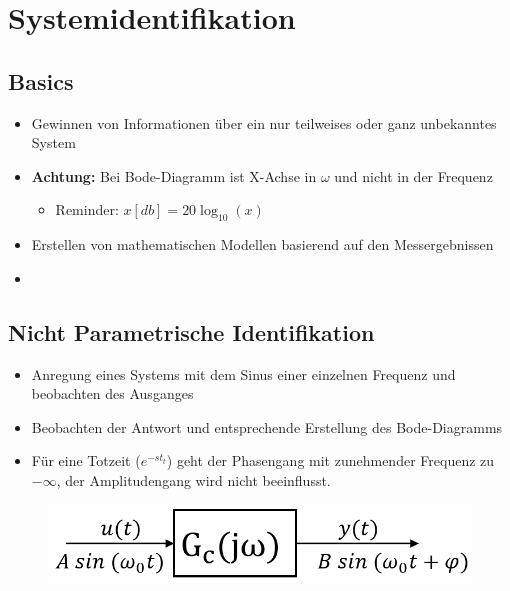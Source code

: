 \section{Systemidentifikation}
\subsection{Basics}
\begin{itemize}
	\item Gewinnen von Informationen über ein nur teilweises oder ganz unbekanntes System
	\item \textbf{Achtung:} Bei Bode-Diagramm ist X-Achse in $\omega$ und nicht in der Frequenz 
	\begin{itemize}
		\item Reminder: $x \left[db\right] = 20\log_{10}\left(x\right)$
	\end{itemize}
	\item Erstellen von mathematischen Modellen basierend auf den Messergebnissen
	\item 
\end{itemize}

\subsection{Nicht Parametrische Identifikation}
\begin{itemize}
	\item Anregung eines Systems mit dem Sinus einer einzelnen Frequenz und beobachten des Ausganges
	\item Beobachten der Antwort und entsprechende Erstellung des Bode-Diagramms
	\item Für eine Totzeit ($e^{-st_t}$) geht der Phasengang mit zunehmender Frequenz zu $-\infty$, der Amplitudengang wird nicht beeinflusst. 
\end{itemize}
\begin{figure}[h!]
	\centering
	\includegraphics[width=0.25\linewidth]{bilder/sysIdent1}
\end{figure}


